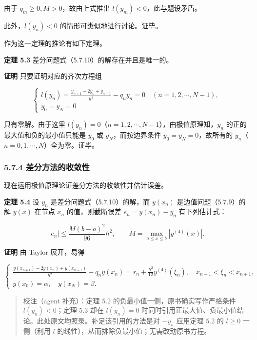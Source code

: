 \documentclass[
  10pt,
  fontset=fandol]{ctexart}
\begin{document}
由于 \(q_m\ge0,M>0\)，故由上式推出 \(l(y_m)<0\)，此与题设矛盾。

此外，\(l(y_n)<0\) 的情形可类似地进行讨论。证毕。

作为这一定理的推论有如下定理。

\textbf{定理 5.3} 差分问题式（5.7.10）的解存在并且是唯一的。

\textbf{证明} 只要证明对应的齐次方程组

\[
\begin{cases}
\displaystyle l(y_n)=\frac{y_{n+1}-2y_n+y_{n-1}}{h^2}-q_ny_n=0\quad(n=1,2,\cdots,N-1),\\[6pt]
y_0=y_N=0
\end{cases}
\]

只有零解。由于这里 \(l(y_n)=0\)（\(n=1,2,\cdots,N-1\)），由极值原理知，\(y_n\) 的正的最大值和负的最小值只能是 \(y_0\) 或 \(y_N\)，而按边界条件 \(y_0=y_N=0\)，故所有的 \(y_n\)（\(n=0,1,\cdots,N\)）全为零。证毕。

\subsubsection{5.7.4 差分方法的收敛性}\label{ux5deeux5206ux65b9ux6cd5ux7684ux6536ux655bux6027}

现在运用极值原理论证差分方法的收敛性并估计误差。

\textbf{定理 5.4} 设 \(y_n\) 是差分问题式（5.7.10）的解，而 \(y(x_n)\) 是边值问题（5.7.9）的解 \(y(x)\) 在节点 \(x_n\) 的值，则截断误差 \(e_n=y(x_n)-y_n\) 有下列估计式：

\[
|e_n|\le\frac{M(b-a)^2}{96}h^2,\qquad
M=\max_{a\le x\le b}|y^{(4)}(x)|.
\tag{5.7.11}
\]

\textbf{证明} 由 Taylor 展开，易得

\[
\begin{cases}
\displaystyle\frac{y(x_{n+1})-2y(x_n)+y(x_{n-1})}{h^2}-q_ny(x_n)=r_n+\frac{h^2}{12}y^{(4)}(\xi_n),\quad x_{n-1}<\xi_n<x_{n+1},\\[6pt]
y(x_0)=\alpha,\quad y(x_N)=\beta.
\end{cases}
\tag{5.7.12}
\]

\begin{quote}
校注（agent 补充）：定理 5.2 的负最小值一侧，原书确实写作严格条件 \(l(y_n)<0\)；定理 5.3 却在 \(l(y_n)=0\) 时同时引用正最大值、负最小值结论。此处原文均照录。补足该引用的方法是对 \(-y_n\) 应用定理 5.2 的 \(l\ge0\) 一侧（利用 \(l\) 的线性），从而排除负最小值；无需改动原书方程。
\end{quote}
\end{document}
